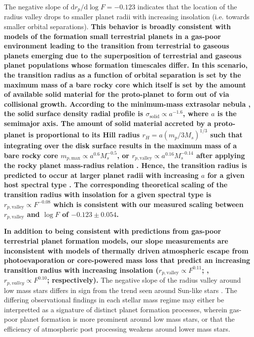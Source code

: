 \documentclass[twocolumn]{emulateapj}
\begin{document}
The negative slope of $\text{d}r_p / \text{d}\log{F} = -0.123$ indicates that the location of the radius valley
drops to smaller planet radii with increasing insolation (i.e. towards smaller orbital separations).
\textbf{This behavior
is broadly consistent with models of the formation small terrestrial planets in a gas-poor environment
\citep{lee14,lee16,lopez18} leading to the transition from terrestrial to gaseous planets emerging due to the
superposition of terrestrial and gaseous planet populations whose formation timescales differ. In this scenario, the
  transition radius as a function of orbital separation is set by the maximum mass of a bare rocky core which
  itself is set by the amount of available solid material for the proto-planet to form out of via collisional
  growth. According to the
  minimum-mass extrasolar nebula \citep{chiang13}, the solid surface density radial profile is
  $\sigma_{\text{solid}} \propto a^{-1.6}$, where $a$ is the semimajor axis. The amount of solid material 
  accreted by a proto-planet
  is proportional to its Hill radius $r_H = a(m_p/3M_s)^{1/3}$ such that integrating over the disk surface results
  in the maximum mass of a bare rocky core $m_{p,\text{max}} \propto a^{0.6} M_s^{-0.5}$, or
  $r_{p,\text{valley}} \propto a^{0.16} M_s^{-0.14}$ after applying the rocky planet mass-radius relation
  \citep{zeng16}. Hence, the transition radius is predicted to occur at larger planet radii with increasing $a$
  for a given host spectral type \citep{lopez18}. The corresponding theoretical scaling of the transition
  radius with insolation for a given spectral type is $r_{p,\text{valley}} \propto F^{-0.08}$
  \citep{lopez18} which is 
  consistent with our measured scaling between $r_{p,\text{valley}}$ and $\log{F}$ of $-0.123\pm 0.054$.}

\textbf{In addition to being consistent with predictions from gas-poor terrestrial planet formation models,
  our slope measurements are inconsistent with models of thermally driven atmospheric
  escape from photoevaporation or core-powered mass loss that predict
an increasing transition radius with increasing insolation ($r_{p,\text{valley}} \propto F^{0.11}$; \citealt{lopez18},  
$r_{p,valley} \propto F^{0.10}$; \citealt{gupta19b} respectively).}
The negative slope of the radius valley around low mass stars differs in sign from the trend seen around
Sun-like stars \citep{martinez19}.
The differing observational findings in each stellar mass regime may either be interpretted as
a signature of distinct planet formation processes, wherein gas-poor planet formation is more prominent
around low mass stars, or that the efficiency of atmospheric post processing weakens around lower mass stars.
\end{document}
